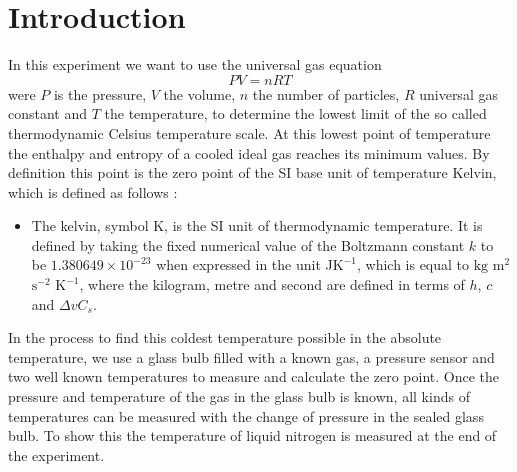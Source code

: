 \section{Introduction}

In this experiment we want to use the universal gas equation \cite{gas}
\begin{equation}
	\displaystyle PV=nRT
	\label{eq::gas}
\end{equation} were $P$ is the pressure, $V$ the volume, $n$ the number of particles, $R$ universal gas constant and $T$ the temperature, to determine the lowest limit of the so called thermodynamic Celsius temperature scale.
At this lowest point of temperature the enthalpy and entropy of a cooled ideal gas reaches its minimum values.
By definition this point is the zero point of the SI base unit of temperature Kelvin, which is defined as follows \cite{kelvin}:
\begin{itemize}
	\item The kelvin, symbol K, is the SI unit of thermodynamic temperature. It is defined
	by taking the fixed numerical value of the Boltzmann constant $k$ to be
	$1.380 649 \times 10^{-23}$ when expressed in the unit \si{\J}$\si{\K}^{-1}$, which is equal to $\si{\kg}$ $\si{\m}^2$ $\si{\s}^{-2}$ $\si{\K}^{-1}$,
	where the kilogram, metre and second are defined in terms of $h$, $c$ and $\Delta vC_s$.
\end{itemize}
 
In the process to find this coldest temperature possible in the absolute temperature, we use a glass bulb filled with a known gas, a pressure sensor and two well known temperatures to measure and calculate the zero point. 
Once the pressure and temperature of the gas in the glass bulb is known, all kinds of temperatures can be measured with the change of pressure in the sealed glass bulb.
To show this the temperature of liquid nitrogen is measured at the end of the experiment.
